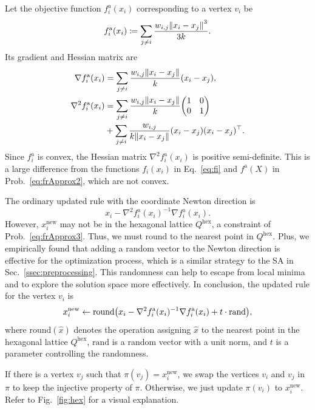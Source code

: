\documentclass[dvipdfmx,10pt,journal,compsoc]{IEEEtran}
\newcommand{\defeq}{\coloneqq}
\begin{document}
Let the objective function $f^{\mathrm{a}}_i(x_i)$ corresponding to a vertex $v_i$ be
\begin{equation*}
  f^{\mathrm{a}}_i(x_i) \defeq \sum_{j \neq i} \frac{w_{i,j}\norm{x_i - x_j}^3}{3k}.
\end{equation*}
Its gradient and Hessian matrix are
\begin{align*}
  \nabla f^{\mathrm{a}}_i(x_i)   & = \sum_{j \neq i} \frac{w_{i,j}\norm{x_i - x_j}}{k} (x_i - x_j),                     \\
  \nabla^2 f^{\mathrm{a}}_i(x_i) & = \sum_{j \neq i} \frac{w_{i,j}\norm{x_i - x_j}}{k} \mqty(1                      & 0 \\0&1) \\
                                 & + \sum_{j \neq i} \frac{w_{i,j}}{k\norm{x_i - x_j}} (x_i - x_j)(x_i - x_j)^\top.
\end{align*}
Since $f^{\mathrm{a}}_i$ is convex, the Hessian matrix $\nabla^2 f^{\mathrm{a}}_i(x_i)$ is positive semi-definite. This is a large difference from the functions $f_i(x_i)$ in Eq.~\eqref{eq:fi} and $f^{\mathrm{a}}(X)$ in Prob.~\eqref{eq:frApprox2}, which are not convex.

The ordinary updated rule with the coordinate Newton direction is
\begin{equation*}
  x_i - \nabla^2 f^{\mathrm{a}}_i(x_i)^{-1} \nabla f^{\mathrm{a}}_i(x_i).
\end{equation*}
However, $x_i^\mathrm{new}$ may not be in the hexagonal lattice $Q^\mathrm{hex}$, a constraint of Prob.~\eqref{eq:frApprox3}.
Thus, we must round to the nearest point in $Q^\mathrm{hex}$. Plus, we empirically found that adding a random vector to the Newton direction is effective for the optimization process, which is a similar strategy to the SA in Sec.~\ref{ssec:preprocessing}. This randomness can help to escape from local minima and to explore the solution space more effectively.
In conclusion, the updated rule for the vertex $v_i$ is
\begin{equation*}
  x_i^\mathrm{new} \gets \mathrm{round}\qty(x_i - \nabla^2 f^{\mathrm{a}}_i(x_i)^{-1} \nabla f^{\mathrm{a}}_i(x_i) + t \cdot \text{rand}),
\end{equation*}
where $\mathrm{round}(\hat{x})$ denotes the operation assigning $\hat{x}$ to the nearest point in the hexagonal lattice $Q^\mathrm{hex}$, $\mathrm{rand}$ is a random vector with a unit norm, and $t$ is a parameter controlling the randomness.

If there is a vertex $v_j$ such that $\pi(v_j) = x_i^\mathrm{new}$, we swap the vertices $v_i$ and $v_j$ in $\pi$ to keep the injective property of $\pi$. Otherwise, we just update $\pi(v_i)$ to $x_i^\mathrm{new}$. Refer to Fig.~\ref{fig:hex} for a visual explanation.
\end{document}

